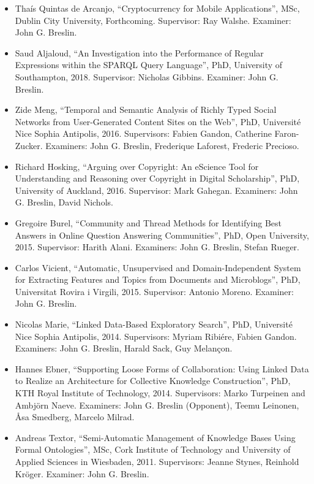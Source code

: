 \documentclass[10pt,a4paper]{res} %
\begin{document}
\begin{resume}
\begin{itemize} \itemsep -2pt

\item Tha\'{i}s Quintas de Arcanjo, ``Cryptocurrency for Mobile Applications'', MSc, Dublin City University, Forthcoming. Supervisor: Ray Walshe. Examiner: John G. Breslin.
\item Saud Aljaloud, ``An Investigation into the Performance of Regular Expressions within the SPARQL Query Language'', PhD, University of Southampton, 2018. Supervisor: Nicholas Gibbins. Examiner: John G. Breslin. %
\item Zide Meng, ``Temporal and Semantic Analysis of Richly Typed Social Networks from User-Generated Content Sites on the Web'', PhD, Universit\'{e} Nice Sophia Antipolis, 2016. Supervisors: Fabien Gandon, Catherine Faron-Zucker. Examiners: John G. Breslin, Frederique Laforest, Frederic Precioso. %
\item Richard Hosking, ``Arguing over Copyright: An eScience Tool for Understanding and Reasoning over Copyright in Digital Scholarship'', PhD, University of Auckland, 2016. Supervisor: Mark Gahegan. Examiners: John G. Breslin, David Nichols.
\item Gregoire Burel, ``Community and Thread Methods for Identifying Best Answers in Online Question Answering Communities'', PhD, Open University, 2015. Supervisor: Harith Alani. Examiners: John G. Breslin, Stefan Rueger. %
\item Carlos Vicient, ``Automatic, Unsupervised and Domain-Independent System for Extracting Features and Topics from Documents and Microblogs'', PhD, Universitat Rovira i Virgili, 2015. Supervisor: Antonio Moreno. Examiner: John G. Breslin.
\item Nicolas Marie, ``Linked Data-Based Exploratory Search'', PhD, Universit\'{e} Nice Sophia Antipolis, 2014. Supervisors: Myriam Ribi\'{e}re, Fabien Gandon. Examiners: John G. Breslin, Harald Sack, Guy Melan\c{c}on.
\item Hannes Ebner, ``Supporting Loose Forms of Collaboration: Using Linked Data to Realize an Architecture for Collective Knowledge Construction'', PhD, KTH Royal Institute of Technology, 2014. Supervisors: Marko Turpeinen and Ambj{\"o}rn Naeve. Examiners: John G. Breslin (Opponent), Teemu Leinonen, \r{A}sa Smedberg, Marcelo Milrad.
\item Andreas Textor, ``Semi-Automatic Management of Knowledge Bases Using Formal Ontologies'', MSc, Cork Institute of Technology and University of Applied Sciences in Wiesbaden, 2011. Supervisors: Jeanne Stynes, Reinhold Kr{\"o}ger. Examiner: John G. Breslin.
\end{itemize}


\end{resume}
\end{document}
